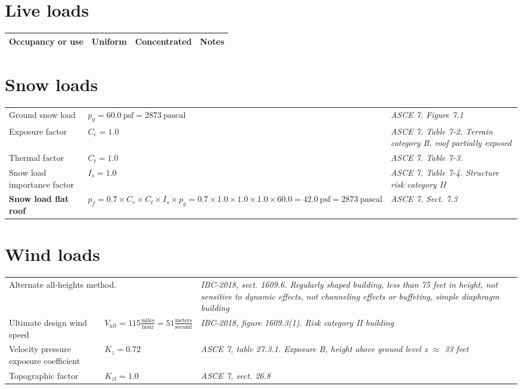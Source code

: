 \section{Live loads}
\begin{tabular}{p{5cm}p{2.5cm}|p{2.5cm}|p{4cm}}
\textbf{Occupancy or use} & \textbf{Uniform} & \textbf{Concentrated} & \textbf{Notes}\\
\hline

\end{tabular}

\section{Snow loads}
\begin{tabular}{p{5cm}p{5cm}|p{5cm}}
Ground snow load & $p_g = 60.0\ \mathrm{psf} = 2873 \ \mathrm{pascal}$ & \emph{ASCE 7. Figure 7.1}\\
Exposure factor & $C_e = 1.0$ &  \emph{ASCE 7. Table 7-2. Terrain category B, roof partially exposed} \\
Thermal factor &  $C_t = 1.0$ & \emph{ASCE 7. Table 7-3.}\\
Snow load importance factor & $I_s = 1.0$ & \emph{ASCE 7. Table 7-4. Structure risk category II}\\
\textbf{Snow load flat roof} & $p_f = 0.7 \times C_e \times C_t \times  I_s\times p_g = 0.7 \times 1.0 \times 1.0 \times 1.0 \times 60.0 = 42.0\ \mathrm{psf} = 2873 \ \mathrm{pascal}$ & \emph{ASCE 7. Sect. 7.3}\\
\end{tabular}

\section{Wind loads}
\begin{tabular}{p{5cm}l|p{5cm}}
\multicolumn{2}{l|}{Alternate all-heights method.} & \emph{IBC-2018, sect. 1609.6.  Regularly shaped building, less than 75 feet in height, not sensitive to dynamic effects, not channeling effects or buffeting, simple diaphragm building} \\
Ultimate design wind speed & $V_{ult} = 115 \frac{\mathrm{miles}}{\mathrm{hour}} = 51 \frac{\mathrm{meters}}{\mathrm{second}} $& \emph{IBC-2018, figure 1609.3(1). Risk category II building}\\
Velocity pressure exposure coefficient & $K_z = 0.72$ & \emph{ASCE 7, table 27.3.1. Exposure B, height above ground level z $\approx$ 33 feet} \\
Topographic factor & $K_{zt} = 1.0 $ & \emph{ASCE 7, sect. 26.8} \\
\end{tabular}

